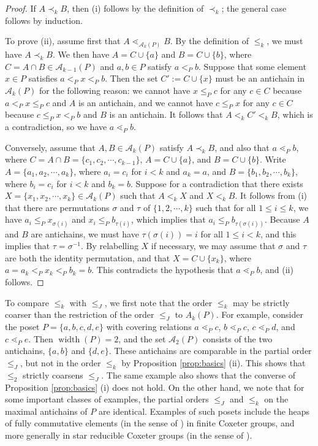 \documentclass[11pt]{amsart}
\theoremstyle{plain}
\theoremstyle{definition}
\theoremstyle{remark}
\numberwithin{equation}{section}
\newcommand{\cala}{\mathcal{A}}
\DeclareMathOperator{\width}{\mathrm{width}}
\begin{document}
\begin{proof}
If $A \prec_k B$, then (i) follows by the definition of $\prec_k$; the general
case follows by induction.

To prove (ii), assume first that $A \lessdot_{\cala_k(P)} B$. By the definition
of $\leq_k$, we must have $A \prec_k B$. We then have $A = C \cup \{a\}$ and $B
= C \cup \{b\}$, where $C = A \cap B \in \cala_{k-1}(P)$ and $a, b \in P$
satisfy $a <_P b$. Suppose that some element $x \in P$ satisfies $a <_P x <_P
b$. Then the set $C' := C \cup \{x\}$ must be an antichain in  $\cala_k(P)$ for
the following reason: we cannot have $x \le_P c$ for any $c \in C$ because $a
<_P x \le_P c$ and $A$ is an antichain, and we cannot have $c \le_P x$ for any
$c \in C$ because $c \le_P x <_P b$ and $B$ is an antichain. It follows that $A
<_k C' <_k B$, which is a contradiction, so we have $a \lessdot_P b$.

Conversely, assume that $A, B \in \cala_k(P)$ satisfy $A \prec_k B$, and also
that $a \lessdot_P b$, where $C = A \cap B = \{c_1, c_2, \cdots, c_{k-1}\}$, $A
= C \cup \{a\}$, and $B = C \cup \{b\}$.  Write $A = \{a_1, a_2, \cdots, a_k\}$,
where $a_i = c_i$ for $i < k$ and $a_k = a$, and $B = \{b_1, b_2, \cdots,
b_k\}$, where $b_i = c_i$ for $i < k$ and $b_k = b$.  Suppose for a
contradiction that there exists $X = \{x_1, x_2, \cdots, x_k\} \in \cala_k(P)$
such that $A <_k X$ and $X <_k B$.  It follows from (i) that there are
permutations $\sigma$ and $\tau$ of $\{1, 2, \cdots, k\}$ such that for all $1
\leq i \leq k$, we have $a_i \leq_P x_{\sigma(i)}$ and $x_i \leq_P b_{\tau(i)}$,
which implies that $a_i \leq_P b_{\tau(\sigma(i))}$.  Because $A$ and $B$ are
antichains, we must have $\tau(\sigma(i)) = i$ for all $1 \leq i < k$, and this
implies that $\tau = \sigma^{-1}$. By relabelling $X$ if necessary, we may
assume that $\sigma$ and $\tau$ are both the identity permutation, and that $X =
C \cup \{x_k\}$, where $a = a_k <_P x_k <_P b_k = b$. This contradicts the
hypothesis that $a \lessdot_P b$, and (ii) follows.
\end{proof}

To compare $\le_k$ with $\le_J$, we first note that the order $\le_k$ may be
strictly coarser than the restriction of the order $\le_J$ to $A_k(P)$. For
example, consider the poset $P = \{a, b, c, d, e\}$  with covering relations $a
\lessdot_P c$, $b \lessdot_P c$, $c \lessdot_P d$, and $c \lessdot_P e$.  Then
$\width(P)=2$, and the set $\cala_2(P)$ consists of the two antichains, $\{a,
b\}$ and $\{d, e\}$. These antichains are comparable in the partial order
$\leq_J$, but not in the order $\le_k$ by Proposition \ref{prop:basics} (ii).
This shows that $\leq_2$ strictly coarsens $\leq_J$. The same example also shows
that the converse of Proposition \ref{prop:basics} (i) does not hold. On the
other hand, we note that for some important classes of examples, the partial
orders $\leq_J$ and $\leq_k$ on the maximal antichains of $P$ are identical.
Examples of such posets include the heaps of fully commutative elements (in the
sense of \cite{FC}) in finite Coxeter groups, and more generally in star
reducible Coxeter groups (in the sense of \cite{star_reducible}).
\end{document}
